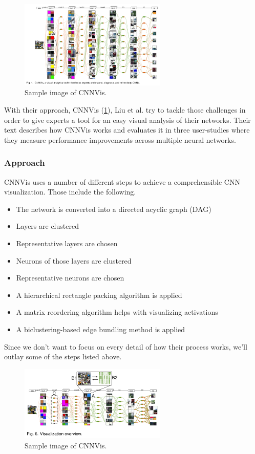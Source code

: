 \documentclass{acmsiggraph}               %
\begin{document}
\begin{figure}
  \centering
  \includegraphics[width=2.75in]{cnnvis}
  \caption{Sample image of CNNVis. \protect\cite{Liu2016}}
  \label{fig:cnnvis}
\end{figure}

With their approach, CNNVis (\ref{fig:cnnvis}), Liu et al. try to tackle those challenges in order to give experts a tool for an easy visual analysis of their networks. Their text describes how CNNVis works and evaluates it in three user-studies where they measure performance improvements across multiple neural networks.\\

\subsubsection{Approach}
CNNVis uses a number of different steps to achieve a comprehensible CNN visualization. Those include the following.

\begin{itemize}
  \item The network is converted into a directed acyclic graph (DAG)
  \item Layers are clustered
  \item Representative layers are chosen
  \item Neurons of those layers are clustered
  \item Representative neurons are chosen
  \item A hierarchical rectangle packing algorithm is applied
  \item A matrix reordering algorithm helps with visualizing activations
  \item A biclustering-based edge bundling method is applied
\end{itemize}

Since we don't want to focus on every detail of how their process works, we'll outlay some of the steps listed above.\\

\begin{figure}
  \centering
  \includegraphics[width=2.75in]{cnnvis_detail}
  \caption{Sample image of CNNVis. \protect\cite{Liu2016}}
  \label{fig:cnnvis_detail}
\end{figure}
\end{document}
